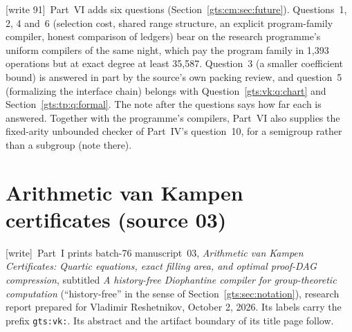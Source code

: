 \documentclass[11pt,letterpaper]{article}
\theoremstyle{definition}
\theoremstyle{remark}
\newcommand{\wtag}{\textup{[write]}}
\newcommand{\wtagd}{\textup{[write 91]}}
\begin{document}
\wtagd\ Part~VI adds six questions (Section~\ref{gts:cm:sec:future}). Questions~1, 2, 4 and~6 (selection cost, shared range structure, an explicit program-family compiler, honest comparison of ledgers) bear on the research programme's uniform compilers of the same night, which pay the program family in 1,393 operations but at exact degree at least 35,587. Question~3 (a smaller coefficient bound) is answered in part by the source's own packing review, and question~5 (formalizing the interface chain) belongs with Question~\ref{gts:vk:q:chart} and Section~\ref{gts:tp:q:formal}. The note after the questions says how far each is answered. Together with the programme's compilers, Part~VI also supplies the fixed-arity unbounded checker of Part~IV's question~10, for a semigroup rather than a subgroup (note there).

\part{Arithmetic van Kampen certificates (source 03)}\label{gts:part:vk}

\noindent\wtag\ Part~I prints batch-76 manuscript~03, \emph{Arithmetic van Kampen Certificates: Quartic equations, exact filling area, and optimal proof-DAG compression}, subtitled \emph{A history-free Diophantine compiler for group-theoretic computation} (``history-free'' in the sense of Section~\ref{gts:sec:notation}), research report prepared for Vladimir Reshetnikov, October 2, 2026. Its labels carry the prefix \texttt{gts:vk:}. Its abstract and the artifact boundary of its title page follow.
\end{document}
